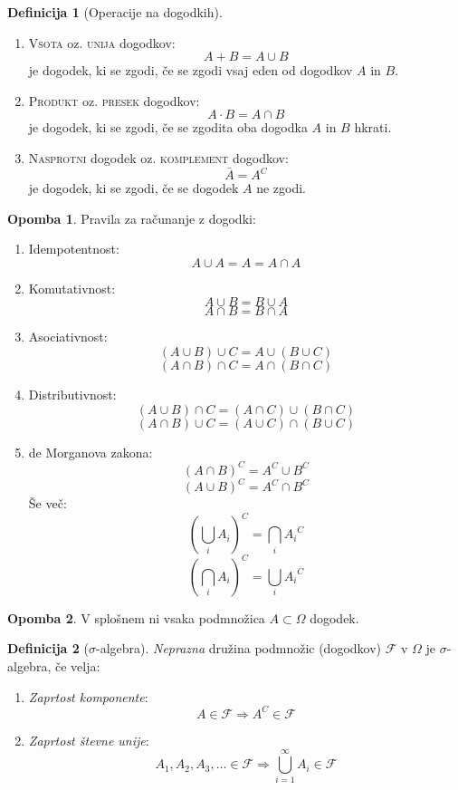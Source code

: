 \documentclass[11pt]{article}
\theoremstyle{definition}
\newtheorem{definicija}{Definicija}[section]
\theoremstyle{definition}
\theoremstyle{definition}
\theoremstyle{theorem}
\theoremstyle{theorem}
\newtheorem*{opomba}{Opomba}
\begin{document}
\begin{definicija}[Operacije na dogodkih]
~
\begin{enumerate}
	\item \textsc{Vsota} oz. \textsc{unija} dogodkov:
	$$A + B = A \cup B$$
	je dogodek, ki se zgodi, če se zgodi vsaj eden od dogodkov $A$ in $B$. \\
	\item \textsc{Produkt} oz. \textsc{presek} dogodkov:
	$$A \cdot B = A \cap B$$
	je dogodek, ki se zgodi, če se zgodita oba dogodka $A$ in $B$ hkrati.
	\item \textsc{Nasprotni} dogodek oz. \textsc{komplement} dogodkov:
	$$\bar{A} = A^C$$
	je dogodek, ki se zgodi, če se dogodek $A$ ne zgodi.
\end{enumerate}
\end{definicija}
\vspace{0.5cm}

\begin{opomba}

Pravila za računanje z dogodki:
\begin{enumerate}
	\item Idempotentnost: 
	$$A \cup A = A = A \cap A$$
	\item Komutativnost:
	$$A \cup B = B \cup A$$
	$$A \cap B = B \cap A$$
	\item Asociativnost:
	$$(A \cup B) \cup C = A \cup (B \cup C)$$
	$$(A \cap B) \cap C = A \cap (B \cap C)$$
	\item Distributivnost:
	$$(A \cup B) \cap C = (A \cap C) \cup (B \cap C)$$
	$$(A \cap B) \cup C = (A \cup C) \cap (B \cup C)$$
	\item de Morganova zakona:
	$$(A \cap B)^C = A^C \cup B^C$$
	$$(A \cup B)^C = A^C \cap B^C$$
	Še več:
	$$\left( \bigcup_i A_i \right)^C = \bigcap_i {A_i}^C$$
	$$\left( \bigcap_i A_i \right)^C = \bigcup_i {A_i}^C$$
\end{enumerate}
\end{opomba}
\vspace{0.5cm}

\begin{opomba}

V splošnem ni vsaka podmnožica $A \subset \Omega$ dogodek.

\end{opomba}
\vspace{0.5cm}

\begin{definicija}[$\sigma$-algebra]

\textit{Neprazna} družina podmnožic (dogodkov) $\mathcal{F}$ v $\Omega$ je $\sigma$-algebra, če velja:
\begin{enumerate}
	\item \textit{Zaprtost komponente}:
	$$A \in \mathcal{F} \Rightarrow A^C \in \mathcal{F}$$
	\item \textit{Zaprtost števne unije}:
	$$A_1, A_2, A_3, \ldots \in \mathcal{F} \Rightarrow \bigcup_{i=1}^{\infty} A_i \in \mathcal{F}$$
\end{enumerate}
\end{definicija}
\vspace{0.5cm}
\end{document}
